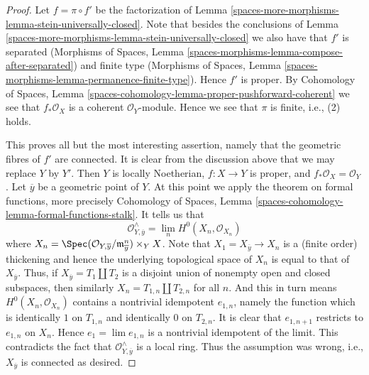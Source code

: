 \begin{proof}
Let $f = \pi \circ f'$ be the factorization of
Lemma \ref{spaces-more-morphisms-lemma-stein-universally-closed}. Note that besides the
conclusions of Lemma \ref{spaces-more-morphisms-lemma-stein-universally-closed} we
also have that $f'$ is separated
(Morphisms of Spaces, Lemma
\ref{spaces-morphisms-lemma-compose-after-separated})
and finite type
(Morphisms of Spaces, Lemma
\ref{spaces-morphisms-lemma-permanence-finite-type}).
Hence $f'$ is proper. By
Cohomology of Spaces, Lemma
\ref{spaces-cohomology-lemma-proper-pushforward-coherent}
we see that $f_*\mathcal{O}_X$ is a coherent $\mathcal{O}_Y$-module.
Hence we see that $\pi$ is finite, i.e., (2) holds.

\medskip\noindent
This proves all but the most interesting assertion, namely that
the geometric fibres of $f'$ are connected. It is clear from the
discussion above that we may replace $Y$ by $Y'$.
Then $Y$ is locally Noetherian,
$f : X \to Y$ is proper, and $f_*\mathcal{O}_X = \mathcal{O}_Y$.
Let $\overline{y}$ be a geometric point of $Y$.
At this point we apply the theorem on formal functions,
more precisely Cohomology of Spaces, Lemma
\ref{spaces-cohomology-lemma-formal-functions-stalk}.
It tells us that
$$
\mathcal{O}^\wedge_{Y, \overline{y}} =
\lim_n H^0(X_n, \mathcal{O}_{X_n})
$$
where $X_n =
\Spec(\mathcal{O}_{Y, \overline{y}}/\mathfrak m_{\overline{y}}^n) \times_Y X$.
Note that $X_1 = X_{\overline{y}} \to X_n$ is a (finite order) thickening
and hence the underlying topological space of $X_n$ is equal to that
of $X_{\overline{y}}$. Thus, if $X_{\overline{y}} = T_1 \amalg T_2$
is a disjoint union of nonempty open and closed subspaces, then similarly
$X_n = T_{1, n} \amalg T_{2, n}$ for all $n$. And this in turn means
$H^0(X_n, \mathcal{O}_{X_n})$ contains a nontrivial idempotent $e_{1, n}$,
namely the function which is identically $1$ on $T_{1, n}$ and
identically $0$ on $T_{2, n}$. It is clear that $e_{1, n + 1}$
restricts to $e_{1, n}$ on $X_n$. Hence $e_1 = \lim e_{1, n}$
is a nontrivial idempotent of the limit. This contradicts the fact
that $\mathcal{O}^\wedge_{Y, \overline{y}}$ is a local ring. Thus the
assumption was wrong, i.e., $X_{\overline{y}}$ is connected
as desired.
\end{proof}

